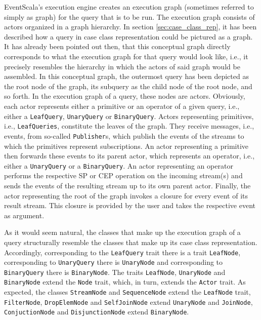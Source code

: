 \documentclass[article, 10pt, type=bsc, colorback, accentcolor=tud8b, parskip=half, bibliography=totocnumbered]{tudthesis}
\begin{document}
EventScala's execution engine creates an execution graph (sometimes referred to simply as graph) for the query that is to be run.
The execution graph consists of actors organized in a graph hierarchy.
In section \ref{sec:case_class_rep}, it has been described how a query in case class representation could be pictured as a graph.
It has already been pointed out then, that this conceptual graph directly corresponds to what the execution graph for that query would look like, i.e., it precisely resembles the hierarchy in which the actors of said graph would be assembled.
In this conceptual graph, the outermost query has been depicted as the root node of the graph, its subquery as the child node of the root node, and so forth.
In the execution graph of a query, these nodes are actors.
Obviously, each actor represents either a primitive or an operator of a given query, i.e., either a \lstinline{LeafQuery}, \lstinline{UnaryQuery} or \lstinline{BinaryQuery}.
Actors representing primitives, i.e., \lstinline{LeafQueries}, constitute the leaves of the graph.
They receive messages, i.e., events, from so-called \lstinline{Publisher}s, which publish the events of the streams to which the primitives represent subscriptions.
An actor representing a primitive then forwards these events to its parent actor, which represents an operator, i.e., either a \lstinline{UnaryQuery} or a \lstinline{BinaryQuery}.
An actor representing an operator performs the respective SP or CEP operation on the incoming stream(s) and sends the events of the resulting stream up to its own parent actor.
Finally, the actor representing the root of the graph invokes a closure for every event of its result stream.
This closure is provided by the user and takes the respective event as argument.

As it would seem natural, the classes that make up the execution graph of a query structurally resemble the classes that make up its case class representation.
Accordingly, corresponding to the \lstinline{LeafQuery} trait there is a trait \lstinline{LeafNode}, corresponding to \lstinline{UnaryQuery} there is \lstinline{UnaryNode} and corresponding to \lstinline{BinaryQuery} there is \lstinline{BinaryNode}.
The traits \lstinline{LeafNode}, \lstinline{UnaryNode} and \lstinline{BinaryNode} extend the \lstinline{Node} trait, which, in turn, extends the \lstinline{Actor} trait.
As expected, the classes \lstinline{StreamNode} and \lstinline{SequenceNode} extend the \lstinline{LeafNode} trait, \lstinline{FilterNode}, \lstinline{DropElemNode} and \lstinline{SelfJoinNode} extend \lstinline{UnaryNode} and \lstinline{JoinNode}, \lstinline{ConjuctionNode} and \lstinline{DisjunctionNode} extend \lstinline{BinaryNode}.
\end{document}
